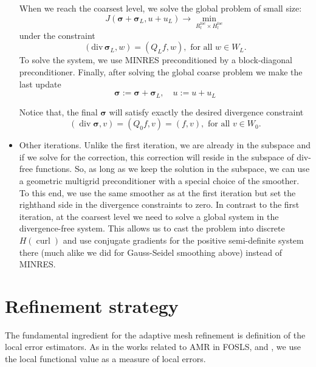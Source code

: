 \documentclass[a4paper,12pt]{amsart}
\numberwithin{equation}{section}
\newtheorem{remark}{Remark}[section]
\newcommand{\curl}{\operatorname{curl}}
\renewcommand{\div}{\operatorname{div}}
\def\bsigma{{\boldsymbol \sigma}}
\begin{document}
\begin{itemize}
	When we reach the coarsest level, we solve the global problem
of small size:
$$
J(\bsigma + \bsigma_L, u + u_L) \rightarrow \min_{R_l^{loc} \times H_l^{loc}}
$$
	under the constraint
$$
(\mathrm{div}\, \bsigma_L, w ) = (Q_L f, w), \text{ for all } w \in W_{L}. 
$$
    To solve the system, we use MINRES preconditioned by a block-diagonal preconditioner.
	Finally, after solving the global coarse problem we make the last update
$$
 \bsigma := \bsigma + \bsigma_L, \quad u := u + u_L
$$	
	
	Notice that, the final $\bsigma$ will satisfy exactly the desired divergence constraint
	$$
	(\div \bsigma, v) = (Q_0 f, v) = (f, v) , \text{ for all } v \in W_0. 
	$$
	
	\item Other iterations. Unlike the first iteration, we are already in the subspace and if we solve for the correction, this correction will reside in the subspace of div-free functions. So, as long as we keep the solution in the subspace, we can use a geometric multigrid preconditioner with a special choice of the smoother.
	To this end, we use the same smoother as at the first iteration but set the righthand side in the divergence constraints to zero.
	In contrast to the first iteration, at the coarsest level we need to solve a global system in the divergence-free system. This allows us to cast the problem into discrete $H(\curl)$ and use conjugate gradients for the positive semi-definite system there (much alike we did for Gauss-Seidel smoothing above) instead of MINRES.
	
\end{itemize}



\section{Refinement strategy}
The fundamental ingredient for the adaptive mesh refinement is definition of the local error estimators. As in the works related to AMR in FOSLS, \cite{fosls_adapt} and \cite{fosls_adapt2}, we use the local functional value as a measure of local errors. 
\end{document}
